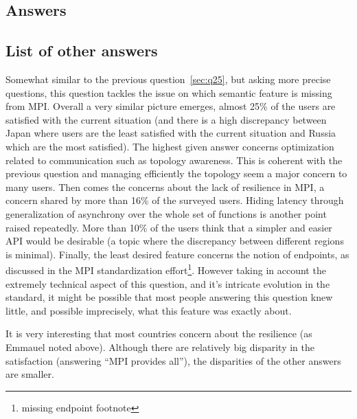 
\subsection{Answers}



\subsection{List of other answers}
\begin{itemize}

\end{itemize}

Somewhat similar to the previous question~\ref{sec:q25}, but asking more precise
questions, this question tackles the issue on which semantic feature is missing
from MPI. Overall a very similar picture emerges, almost 25\% of the users are
satisfied with the current situation (and there is a high discrepancy between
Japan where users are the least satisfied with the current situation and Russia
which are the most satisfied).
The highest given answer concerns optimization related to communication such as
topology awareness. This is coherent with the previous question and managing
efficiently the topology seem a major concern to many users. Then comes the
concerns about the lack of resilience in MPI, a concern shared by more than 16\%
of the surveyed users. Hiding latency through generalization of asynchrony over
the whole set of functions is another point raised repeatedly. More than 10\% of
the users think that a simpler and easier API would be desirable (a topic where
the discrepancy between different regions is minimal).
%
%
Finally, the least desired feature concerns the notion of endpoints, as
discussed in the MPI standardization effort\footnote{missing endpoint footnote}.
However taking in account the extremely technical aspect of this question, and
it's intricate evolution in the standard, it might be possible that most people
answering this question knew little, and possible imprecisely, what this feature
was exactly about.

It is very interesting that most countries concern about the
resilience (as Emmauel noted above). Although there are relatively big
disparity in the satisfaction (answering ``MPI provides all''), the
disparities of the other answers are smaller.

